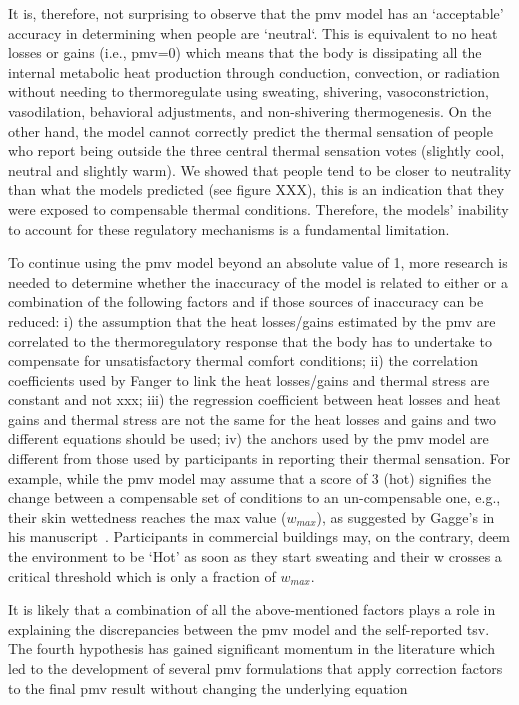 It is, therefore, not surprising to observe that the \ac{pmv} model has an `acceptable' accuracy in determining when people are `neutral`.
This is equivalent to no heat losses or gains (i.e., \ac{pmv}=0) which means that the body is dissipating all the internal metabolic heat production through conduction, convection, or radiation without needing to thermoregulate using sweating, shivering, vasoconstriction, vasodilation, behavioral adjustments, and non-shivering thermogenesis.
On the other hand, the model cannot correctly predict the thermal sensation of people who report being outside the three central thermal sensation votes (slightly cool, neutral and slightly warm).
We showed that people tend to be closer to neutrality than what the models predicted (see figure XXX), this is an indication that they were exposed to compensable thermal conditions. Therefore, the models' inability to account for these regulatory mechanisms is a fundamental limitation.

To continue using the \ac{pmv} model beyond an absolute value of 1, more research is needed to determine whether the inaccuracy of the model is related to either or a combination of the following factors and if those sources of inaccuracy can be reduced: 
i) the assumption that the heat losses/gains estimated by the \ac{pmv} are correlated to the thermoregulatory response that the body has to undertake to compensate for unsatisfactory thermal comfort conditions;
ii) the correlation coefficients used by Fanger to link the heat losses/gains and thermal stress are constant and not xxx;
iii) the regression coefficient between heat losses and heat gains and thermal stress are not the same for the heat losses and gains and two different equations should be used;
iv) the anchors used by the \ac{pmv} model are different from those used by participants in reporting their thermal sensation.
For example, while the \ac{pmv} model may assume that a score of 3 (hot) signifies the change between a compensable set of conditions to an un-compensable one, e.g., their skin wettedness reaches the max value ($w_{max}$), as suggested by Gagge's in his manuscript~\cite{GaggeSET}.
Participants in commercial buildings may, on the contrary, deem the environment to be `Hot' as soon as they start sweating and their \ac{w} crosses a critical threshold which is only a fraction of $w_{max}$.

It is likely that a combination of all the above-mentioned factors plays a role in explaining the discrepancies between the \ac{pmv} model and the self-reported \ac{tsv}.
The fourth hypothesis has gained significant momentum in the literature which led to the development of several \ac{pmv} formulations that apply correction factors to the final \ac{pmv} result without changing the underlying equation~\cite{Yao2022, Toftum2002}

